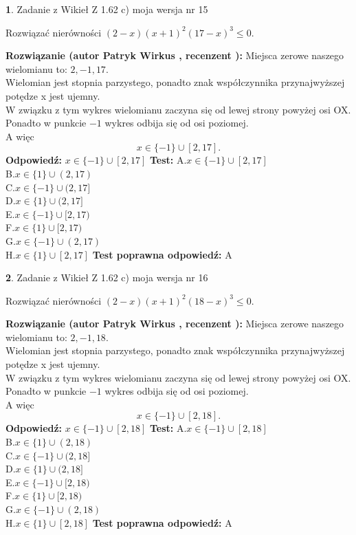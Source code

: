 \documentclass[12pt, a4paper]{article}
\theoremstyle{definition} %
\newtheorem{zad}{}
\newcommand{\zadStart}[1]{\begin{zad}#1\newline}
\newcommand{\zadStop}{\end{zad}}
\newcommand{\rozwStart}[2]{\noindent \textbf{Rozwiązanie (autor #1 , recenzent #2): }\newline}
\newcommand{\rozwStop}{\newline}
\newcommand{\odpStart}{\noindent \textbf{Odpowiedź:}\newline}
\newcommand{\odpStop}{\newline}
\newcommand{\testStart}{\noindent \textbf{Test:}\newline}
\newcommand{\testStop}{\newline}
\newcommand{\kluczStart}{\noindent \textbf{Test poprawna odpowiedź:}\newline}
\newcommand{\kluczStop}{\newline}
\begin{document}
\zadStart{Zadanie z Wikieł Z 1.62 c) moja wersja nr 15}

Rozwiązać nierówności $(2-x)(x+1)^{2}(17-x)^{3}\le0$.
\zadStop
\rozwStart{Patryk Wirkus}{}
Miejsca zerowe naszego wielomianu to: $2, -1, 17$.\\
Wielomian jest stopnia parzystego, ponadto znak współczynnika przy\linebreak najwyższej potędze x jest ujemny.\\ W związku z tym wykres wielomianu zaczyna się od lewej strony powyżej osi OX.\\
Ponadto w punkcie $-1$ wykres odbija się od osi poziomej.\\
A więc $$x \in \{-1\} \cup [2,17].$$
\rozwStop
\odpStart
$x \in \{-1\} \cup [2,17]$
\odpStop
\testStart
A.$x \in \{-1\} \cup [2,17]$\\
B.$x \in \{1\} \cup (2,17)$\\
C.$x \in \{-1\} \cup (2,17]$\\
D.$x \in \{1\} \cup (2,17]$\\
E.$x \in \{-1\} \cup [2,17)$\\
F.$x \in \{1\} \cup [2,17)$\\
G.$x \in \{-1\} \cup (2,17)$\\
H.$x \in \{1\} \cup [2,17]$
\testStop
\kluczStart
A
\kluczStop



\zadStart{Zadanie z Wikieł Z 1.62 c) moja wersja nr 16}

Rozwiązać nierówności $(2-x)(x+1)^{2}(18-x)^{3}\le0$.
\zadStop
\rozwStart{Patryk Wirkus}{}
Miejsca zerowe naszego wielomianu to: $2, -1, 18$.\\
Wielomian jest stopnia parzystego, ponadto znak współczynnika przy\linebreak najwyższej potędze x jest ujemny.\\ W związku z tym wykres wielomianu zaczyna się od lewej strony powyżej osi OX.\\
Ponadto w punkcie $-1$ wykres odbija się od osi poziomej.\\
A więc $$x \in \{-1\} \cup [2,18].$$
\rozwStop
\odpStart
$x \in \{-1\} \cup [2,18]$
\odpStop
\testStart
A.$x \in \{-1\} \cup [2,18]$\\
B.$x \in \{1\} \cup (2,18)$\\
C.$x \in \{-1\} \cup (2,18]$\\
D.$x \in \{1\} \cup (2,18]$\\
E.$x \in \{-1\} \cup [2,18)$\\
F.$x \in \{1\} \cup [2,18)$\\
G.$x \in \{-1\} \cup (2,18)$\\
H.$x \in \{1\} \cup [2,18]$
\testStop
\kluczStart
A
\kluczStop
\end{document}
